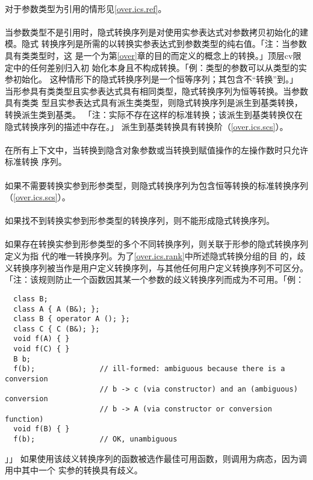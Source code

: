 \paragraph{}
对于参数类型为引用的情形见\ref{over.ics.ref}。

\paragraph{}
当参数类型不是引用时，隐式转换序列是对使用实参表达式对参数拷贝初始化的建模。隐式
转换序列是所需的以转换实参表达式到参数类型的纯右值。「注：当参数具有类类型时，这
是一个为第\ref{over}章的目的而定义的概念上的转换。」顶层cv限定中的任何差别归入初
始化本身且不构成转换。「例：类型的参数可以从类型的实参初始化。
这种情形下的隐式转换序列是一个恒等序列；其包含不``转换''到。」
当形参具有类类型且实参表达式具有相同类型，隐式转换序列为恒等转换。当参数具有类类
型且实参表达式具有派生类类型，则隐式转换序列是派生到基类转换，转换派生类到基类。
「注：实际不存在这样的标准转换；该派生到基类转换仅在隐式转换序列的描述中存在。」
派生到基类转换具有转换阶（\ref{over.ics.scs}）。

\paragraph{}
在所有上下文中，当转换到隐含对象参数或当转换到赋值操作的左操作数时只允许标准转换
序列。

\paragraph{}
如果不需要转换实参到形参类型，则隐式转换序列为包含恒等转换的标准转换序列
（\ref{over.ics.scs}）。

\paragraph{}
如果找不到转换实参到形参类型的转换序列，则不能形成隐式转换序列。

\paragraph{}
如果存在转换实参到形参类型的多个不同转换序列，则关联于形参的隐式转换序列定义为指
代的唯一转换序列。为了\ref{over.ics.rank}中所述隐式转换分组的目
的，歧义转换序列被当作是用户定义转换序列，与其他任何用户定义转换序列不可区分。
「注：该规则防止一个函数因其某一个参数的歧义转换序列而成为不可用。「例：
\begin{lstlisting}
  class B;
  class A { A (B&); };
  class B { operator A (); };
  class C { C (B&); };
  void f(A) { }
  void f(C) { }
  B b;
  f(b);               // ill-formed: ambiguous because there is a conversion
                      // b -> c (via constructor) and an (ambiguous) conversion
                      // b -> A (via constructor or conversion function)
  void f(B) { }
  f(b);               // OK, unambiguous
\end{lstlisting}」」
如果使用该歧义转换序列的函数被选作最佳可用函数，则调用为病态，因为调用中其中一个
实参的转换具有歧义。

